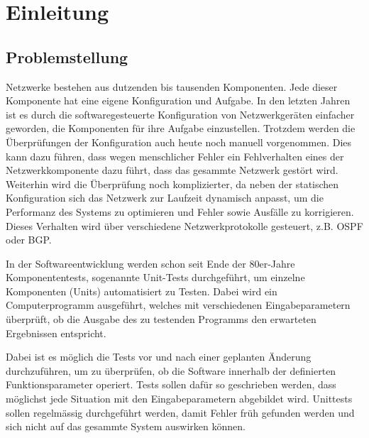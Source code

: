 \documentclass[]{subfiles}
\begin{document}
    \section{Einleitung}
    \subsection{Problemstellung}
    Netzwerke bestehen aus dutzenden bis tausenden Komponenten. 
    Jede dieser Komponente hat eine eigene Konfiguration und Aufgabe.
    In den letzten Jahren ist es durch die softwaregesteuerte Konfiguration
    von Netzwerkgeräten einfacher geworden, die Komponenten für ihre
    Aufgabe einzustellen. Trotzdem werden die Überprüfungen der Konfiguration 
    auch heute noch manuell vorgenommen. Dies kann dazu führen, dass wegen menschlicher
    Fehler ein Fehlverhalten eines der Netzwerkkomponente dazu führt,
    dass das gesammte Netzwerk gestört wird. 
    Weiterhin wird die Überprüfung noch komplizierter, da neben der statischen 
    Konfiguration sich das Netzwerk zur Laufzeit dynamisch anpasst, 
    um die Performanz des Systems zu optimieren und Fehler sowie Ausfälle
    zu korrigieren. 
    Dieses Verhalten wird über verschiedene Netzwerkprotokolle gesteuert, z.B. OSPF oder
    BGP.
    
    In der Softwareentwicklung werden schon seit 
    Ende der 80er-Jahre Komponententests, sogenannte Unit-Tests durchgeführt, um einzelne 
    Komponenten (Units) automatisiert zu Testen. Dabei wird ein Computerprogramm ausgeführt,
    welches mit verschiedenen Eingabeparametern überprüft, ob die Ausgabe des zu testenden
    Programms den erwarteten Ergebnissen entspricht.

    Dabei ist es möglich die Tests vor und nach einer geplanten Änderung durchzuführen,
    um zu überprüfen, ob die Software innerhalb der definierten Funktionsparameter operiert.
    Tests sollen dafür so geschrieben werden, dass möglichst jede Situation mit den 
    Eingabeparametern abgebildet wird. Unittests sollen regelmässig durchgeführt werden,
    damit Fehler früh gefunden werden und sich nicht auf das gesammte System auswirken können.

    \newpage
    
\end{document}
